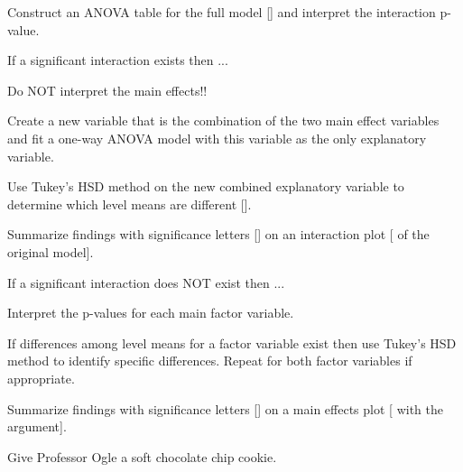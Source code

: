 \documentclass[10pt,openany]{book}\usepackage[]{graphicx}\usepackage[]{color}
\begin{document}
\begin{Enumerate}
  \item Construct an ANOVA table for the full model [] and interpret the interaction p-value.
  \item If a significant interaction exists then ...
    \begin{Itemize}
      \item Do NOT interpret the main effects!!
      \item Create a new variable that is the combination of the two main effect variables and fit a one-way ANOVA model with this variable as the only explanatory variable.
      \item Use Tukey's HSD method on the new combined explanatory variable to determine which level means are different [].
      \item Summarize findings with significance letters [] on an interaction plot [ of the original model].
    \end{Itemize}
  \item If a significant interaction does NOT exist then ...
    \begin{Itemize}
      \item Interpret the p-values for each main factor variable.
      \item If differences among level means for a factor variable exist then use Tukey's HSD method to identify specific differences.  Repeat for both factor variables if appropriate.
      \item Summarize findings with significance letters [] on a main effects plot [ with the  argument].
    \end{Itemize}
  \item Give Professor Ogle a soft chocolate chip cookie.
\end{Enumerate}
\end{document}
